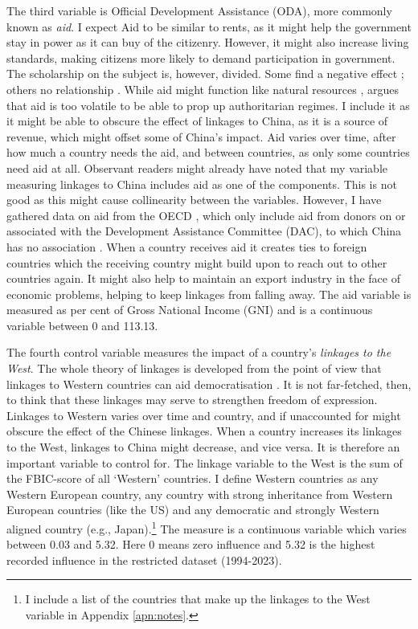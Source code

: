 The third variable is Official Development Assistance (ODA), more commonly known as \textit{aid}. I expect Aid to be similar to rents, as it might help the government stay in power as it can buy of the citizenry. However, it might also increase living standards, making citizens more likely to demand participation in government. The scholarship on the subject is, however, divided. Some find a negative effect \citep{djankov_curse_2008}; others no relationship \citep{altincekic_why_2014}. While aid might function like natural resources \citep{djankov_curse_2008}, \citet[p. 30]{altincekic_why_2014} argues that aid is too volatile to be able to prop up authoritarian regimes. I include it as it might be able to obscure the effect of linkages to China, as it is a source of revenue, which might offset some of China's impact. Aid varies over time, after how much a country needs the aid, and between countries, as only some countries need aid at all. Observant readers might already have noted that my variable measuring linkages to China includes aid as one of the components. This is not good as this might cause collinearity between the variables. However, I have gathered data on aid from the OECD \citep{oecd_dac2a_2025}, which only include aid from donors on or associated with the Development Assistance Committee (DAC), to which China has no association \citep{oecd_development_2025}. When a country receives aid it creates ties to foreign countries which the receiving country might build upon to reach out to other countries again. It might also help to maintain an export industry in the face of economic problems, helping to keep linkages from falling away. The aid variable is measured as per cent of Gross National Income (GNI) and is a continuous variable between 0 and 113.13. 

The fourth control variable measures the impact of a country's \textit{linkages to the West}. The whole theory of linkages is developed from the point of view that linkages to Western countries can aid democratisation \citep{levitsky_linkage_2006}. It is not far-fetched, then, to think that these linkages may serve to strengthen freedom of expression. Linkages to Western varies over time and country, and if unaccounted for might obscure the effect of the Chinese linkages. When a country increases its linkages to the West, linkages to China might decrease, and vice versa. It is therefore an important variable to control for. The linkage variable to the West is the sum of the FBIC-score of all `Western' countries. I define Western countries as any Western European country, any country with strong inheritance from Western European countries (like the US) and any democratic and strongly Western aligned country (e.g., Japan).\footnote{I include a list of the countries that make up the linkages to the West variable in Appendix \ref{apn:notes}.} The measure is a continuous variable which varies between 0.03 and 5.32. Here 0 means zero influence and 5.32 is the highest recorded influence in the restricted dataset (1994-2023). 

